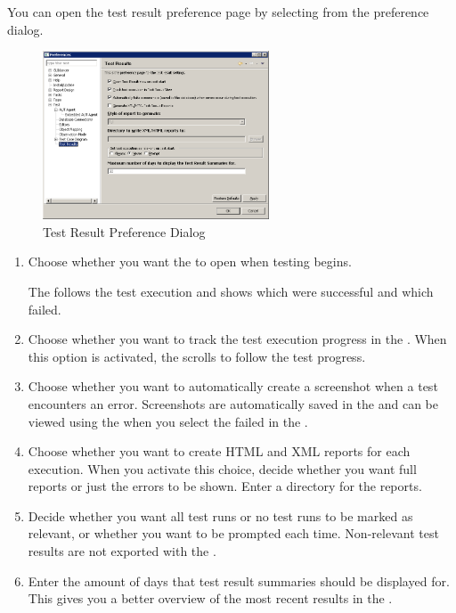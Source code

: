 
You can open the test result preference page by selecting  from the preference dialog. 

\begin{figure}[h]
\begin{center}
\includegraphics[width=0.6\textwidth]{Tasks/Preferences/PS/testresultprefs}
\caption{Test Result Preference Dialog}
\label{testresultprefs}
\end{center}
\end{figure}
\begin{enumerate}
\item Choose whether you want the  \gdtestresultview{} to open when testing begins. 

The \gdtestresultview{} follows the test execution and shows which \gdsteps{} were successful and which failed. 

\item Choose whether you want to track the test execution progress in the \gdtestresultview{}. When this option is activated, the \gdtestresultview{} scrolls to follow the test progress. 
\item Choose whether you want \app{} to automatically create a screenshot when a test encounters an error. Screenshots are automatically saved in the \gddb{} and can be viewed using the \gdimgview{} when you select the failed \gdstep{} in the \gdtestresultview{}. 
\item Choose whether you want to create HTML and XML reports for each execution. When you activate this choice, decide whether you want full reports or just the errors to be shown. Enter a directory for the reports. 
\item Decide whether you want all test runs or no test runs to be marked as relevant, or whether you want to be prompted each time. Non-relevant test results are not exported with the \gdproject{}. 
\item Enter the amount of days that test result summaries should be displayed for. This gives you a better overview of the most recent results in the \gdtestsummaryview{}. 
\end{enumerate}


